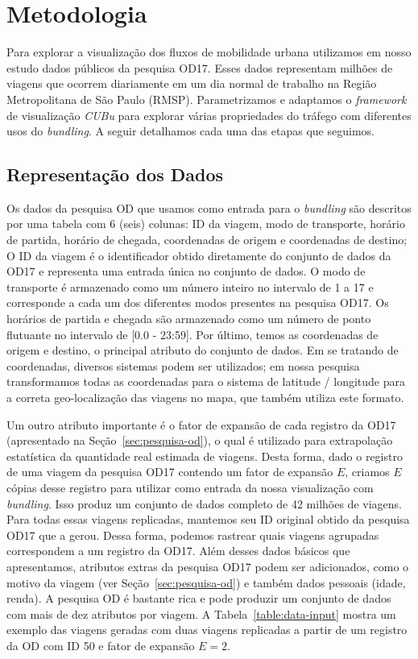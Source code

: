 \chapter{Metodologia}
\label{cap:metodologia}

Para explorar a visualização dos fluxos de mobilidade urbana utilizamos em nosso
estudo dados públicos da pesquisa OD17. Esses dados representam milhões de viagens
que ocorrem diariamente em um dia normal de trabalho na Região Metropolitana
de São Paulo (RMSP). Parametrizamos e adaptamos o \emph{framework} de visualização \emph{CUBu} para explorar várias
propriedades do tráfego com diferentes usos do \emph{bundling}. A seguir
detalhamos cada uma das etapas que seguimos.

\section{Representação dos Dados}

Os dados da pesquisa OD que usamos como entrada para o \emph{bundling} são
descritos por uma tabela com 6 (seis) colunas: ID da viagem, modo de transporte,
horário de partida, horário de chegada, coordenadas de origem e coordenadas de
destino; O ID da viagem é o identificador obtido
diretamente do conjunto de dados da OD17 e representa uma entrada única no conjunto
de dados. O modo de transporte é armazenado como um número inteiro no intervalo
de 1 a 17 e corresponde a cada um dos diferentes modos presentes na pesquisa OD17.
Os horários de partida e chegada são armazenado como um número de ponto
flutuante no intervalo de [0.0 - 23:59]. Por último, temos as coordenadas de
origem e destino, o principal atributo do conjunto de dados. Em se tratando de
coordenadas, diversos sistemas podem ser utilizados; em nossa pesquisa
transformamos todas as coordenadas para o sistema de latitude / longitude para a
correta geo-localização das viagens no mapa, que também utiliza este formato.

Um outro atributo importante é o fator de expansão de cada registro da OD17 (apresentado na Seção~\ref{sec:pesquisa-od}),
o qual é utilizado para extrapolação estatística da quantidade real estimada de viagens.
Desta forma, dado o registro de uma viagem da pesquisa OD17 contendo um fator de expansão $E$, criamos $E$
cópias desse registro para utilizar como entrada da nossa visualização com \emph{bundling}. Isso produz um conjunto de dados completo de 42
milhões de viagens. Para todas essas viagens replicadas, mantemos seu ID original
obtido da pesquisa OD17 que a gerou. Dessa forma, podemos rastrear quais viagens
agrupadas correspondem a um registro da OD17. Além desses dados básicos que apresentamos, atributos
extras da pesquisa OD17 podem ser adicionados, como o motivo da viagem (ver
Seção~\ref{sec:pesquisa-od}) e também dados pessoais (idade, renda). A pesquisa
OD é bastante rica e pode produzir um conjunto de dados com mais de dez atributos por viagem.
A Tabela~\ref{table:data-input} mostra um exemplo das viagens geradas com duas
viagens replicadas a partir de um registro da OD com ID 50 e fator de expansão $E=2$.

